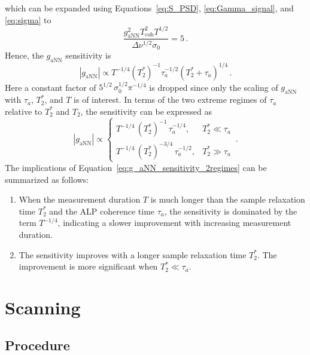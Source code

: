 which can be expanded using Equations~\eqref{eq:S_PSD}, \eqref{eq:Gamma_signal}, and \eqref{eq:sigma} to
\begin{equation}
    \frac{g_{\mathrm{aNN}}^2 T_\mathrm{coh}^2 T^{1/2} }{\Delta\nu^{1/2}\sigma_0} = 5
    \,.\label{eq:SNR_condition_expanded}
\end{equation}
Hence, the $g_{\mathrm{aNN}}$ sensitivity is
\begin{equation}
    \left|g_{\mathrm{aNN}}\right| \propto
    T^{-1/4}
    \left(T_2^*\right)^{-1}
    \tau_a^{-1/2}
    \left(T_2^* + \tau_a\right)^{1/4}
    \,.\label{eq:g_aNN_sensitivity}
\end{equation}
Here a constant factor of $5^{1/2}\,\sigma_0^{1/2} \pi^{-1/4}$ is dropped since only the scaling of $g_{\mathrm{aNN}}$ with $\tau_a$, $T_2^*$, and $T$ is of interest.
In terms of the two extreme regimes of $\tau_a$ relative to $T_2^*$ and $T_2$, the sensitivity can be expressed as
\begin{equation}
    \left|g_{\mathrm{aNN}}\right| \propto
    \left\{
    \begin{array}{cl}
    T^{-1/4}\, \left(T_2^*\right)^{-1}\, \tau_a^{-1/4}  ,
    &  T_2^* \ll \tau_a \\[6pt]
    T^{-1/4}\, \left(T_2^*\right)^{-3/4}\, \tau_a^{-1/2}   ,
    &  T_2^* \gg \tau_a
    \end{array} \right.
    \,. \label{eq:g_aNN_sensitivity_2regimes}
\end{equation}
The implications of Equation~\eqref{eq:g_aNN_sensitivity_2regimes} can be summarized as follows:
\begin{enumerate}
    \item When the measurement duration $T$ is much longer than the sample relaxation time $T_2^*$ and the ALP coherence time $\tau_a$, the sensitivity is dominated by the term $T^{-1/4}$, indicating a slower improvement with increasing measurement duration.
    \item The sensitivity improves with a longer sample relaxation time $T_2^*$. The improvement is more significant when $T_2^* \ll \tau_a$.
\end{enumerate}


\section{Scanning}\label{sec:experiment:scanning}

\subsection{Procedure}\label{sec:experiment:scanning:procedure}

